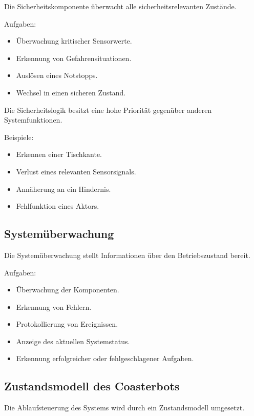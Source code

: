 \documentclass[
  a4paper,
  12pt,
  DIV=12,        %
  parskip=half,  %
  headings=small %
]{scrartcl}
\theoremstyle{definition}
\providecommand{\tightlist}{%
  \setlength{\itemsep}{0pt}\setlength{\parskip}{0pt}}
\theoremstyle{definition}
\begin{document}
Die Sicherheitskomponente überwacht alle sicherheitsrelevanten Zustände.

Aufgaben:

\begin{itemize}
\tightlist
\item
  Überwachung kritischer Sensorwerte.
\item
  Erkennung von Gefahrensituationen.
\item
  Auslösen eines Notstopps.
\item
  Wechsel in einen sicheren Zustand.
\end{itemize}

Die Sicherheitslogik besitzt eine hohe Priorität gegenüber anderen
Systemfunktionen.

Beispiele:

\begin{itemize}
\tightlist
\item
  Erkennen einer Tischkante.
\item
  Verlust eines relevanten Sensorsignals.
\item
  Annäherung an ein Hindernis.
\item
  Fehlfunktion eines Aktors.
\end{itemize}

\subsection{Systemüberwachung}\label{systemuxfcberwachung-1}

Die Systemüberwachung stellt Informationen über den Betriebszustand
bereit.

Aufgaben:

\begin{itemize}
\tightlist
\item
  Überwachung der Komponenten.
\item
  Erkennung von Fehlern.
\item
  Protokollierung von Ereignissen.
\item
  Anzeige des aktuellen Systemstatus.
\item
  Erkennung erfolgreicher oder fehlgeschlagener Aufgaben.
\end{itemize}

\subsection{Zustandsmodell des
Coasterbots}\label{zustandsmodell-des-coasterbots}

Die Ablaufsteuerung des Systems wird durch ein Zustandsmodell umgesetzt.
\end{document}
